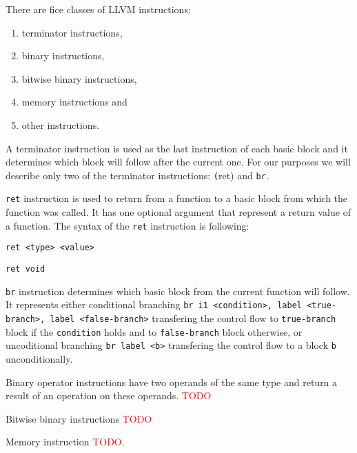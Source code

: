 There are fice classes of LLVM instructions:

\begin{enumerate}
 \item terminator instructions,
 \item binary instructions,
 \item bitwise binary instructions,
 \item memory instructions and
 \item other instructions.
\end{enumerate}

A terminator instruction is used as the last instruction of each basic block
and it determines which block will follow after the current one. For our
purposes we will describe only two of the terminator instructions: \texttt(ret)
and \texttt{br}.

\texttt{ret} instruction is used to return from a function to a basic block
from which the function was called. It has one optional argument that represent
a return value of a function. The syntax of the \texttt{ret} instruction is
following:

\medskip
\noindent \texttt{ret <type> <value>} 

\noindent \texttt{ret void}
\medskip

\texttt{br} instruction determines which basic block from the current function
will follow. It represents either conditional branching \texttt{br i1
<condition>, label <true-branch>, label <false-branch>} transfering the control
flow to \texttt{true-branch} block if the \texttt{condition} holds and to
\texttt{false-branch} block otherwise, or uncoditional branching \texttt{br
label <b>} transfering the control flow to a block \texttt{b} unconditionally.

Binary operator instructions have two operands of the same type and return a
result of an operation on these operands. \textcolor{red}{TODO}

Bitwise binary instructions \textcolor{red}{TODO}

Memory instruction \textcolor{red}{TODO}.
